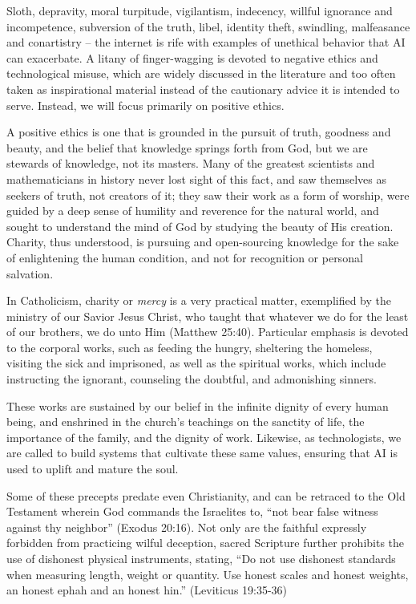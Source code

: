 \documentclass[sigplan,nonacm]{acmart}\settopmatter{printfolios=false,printccs=false,printacmref=false}
\begin{document}
  Sloth, depravity, moral turpitude, vigilantism, indecency, willful ignorance and incompetence, subversion of the truth, libel, identity theft, swindling, malfeasance and conartistry -- the internet is rife with examples of unethical behavior that AI can exacerbate. A litany of finger-wagging is devoted to negative ethics and technological misuse, which are widely discussed in the literature and too often taken as inspirational material instead of the cautionary advice it is intended to serve. Instead, we will focus primarily on positive ethics.

  A positive ethics is one that is grounded in the pursuit of truth, goodness and beauty, and the belief that knowledge springs forth from God, but we are stewards of knowledge, not its masters. Many of the greatest scientists and mathematicians in history never lost sight of this fact, and saw themselves as seekers of truth, not creators of it; they saw their work as a form of worship, were guided by a deep sense of humility and reverence for the natural world, and sought to understand the mind of God by studying the beauty of His creation. Charity, thus understood, is pursuing and open-sourcing knowledge for the sake of enlightening the human condition, and not for recognition or personal salvation.


  In Catholicism, charity or \textit{mercy} is a very practical matter, exemplified by the ministry of our Savior Jesus Christ, who taught that whatever we do for the least of our brothers, we do unto Him (Matthew 25:40). Particular emphasis is devoted to the corporal works, such as feeding the hungry, sheltering the homeless, visiting the sick and imprisoned, as well as the spiritual works, which include instructing the ignorant, counseling the doubtful, and admonishing sinners.

  These works are sustained by our belief in the infinite dignity of every human being, and enshrined in the church's teachings on the sanctity of life, the importance of the family, and the dignity of work. Likewise, as technologists, we are called to build systems that cultivate these same values, ensuring that AI is used to uplift and mature the soul.

  Some of these precepts predate even Christianity, and can be retraced to the Old Testament wherein God commands the Israelites to, ``not bear false witness against thy neighbor'' (Exodus 20:16). Not only are the faithful expressly forbidden from practicing wilful deception, sacred Scripture further prohibits the use of dishonest physical instruments, stating, ``Do not use dishonest standards when measuring length, weight or quantity. Use honest scales and honest weights, an honest ephah and an honest hin.'' (Leviticus 19:35-36)%
\end{document}
